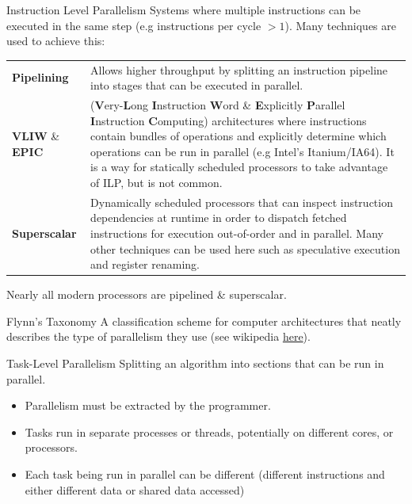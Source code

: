 \begin{definitionbox}{Instruction Level Parallelism}
    Systems where multiple instructions can be executed in the same step (e.g instructions per cycle $> 1$). Many techniques are used to achieve this:
    \vspace{2mm}
    \\ \begin{tabular}{l p{}}
        \textbf{Pipelining} & Allows higher throughput by splitting an instruction pipeline into stages that can be executed in parallel. \\
        \textbf{VLIW} \& \textbf{EPIC} & (\textbf{V}ery-\textbf{L}ong \textbf{I}nstruction \textbf{W}ord \& \textbf{E}xplicitly \textbf{P}arallel \textbf{I}nstruction \textbf{C}omputing) architectures where instructions contain bundles of operations and explicitly determine which operations can be run in parallel (e.g Intel's Itanium/IA64). It is a way for statically scheduled processors to take advantage of ILP, but is not common. \\
        \textbf{Superscalar} & Dynamically scheduled processors that can inspect instruction dependencies at runtime in order to dispatch fetched instructions for execution out-of-order and in parallel. Many other techniques can be used here such as speculative execution and register renaming. \\
    \end{tabular}
    Nearly all modern processors are pipelined \& superscalar.
\end{definitionbox}

\begin{sidenotebox}{Flynn's Taxonomy}
    A classification scheme for computer architectures that neatly describes the type of parallelism they use (see wikipedia \href{https://en.wikipedia.org/wiki/Flynn%27s_taxonomy}{here}).
\end{sidenotebox}

\begin{definitionbox}{Task-Level Parallelism}
    Splitting an algorithm into sections that can be run in parallel.
    \begin{itemize}
        \item Parallelism must be extracted by the programmer.
        \item Tasks run in separate processes or threads, potentially on different cores, or processors. 
        \item Each task being run in parallel can be different (different instructions and either different data or shared data accessed)
    \end{itemize}
\end{definitionbox}

